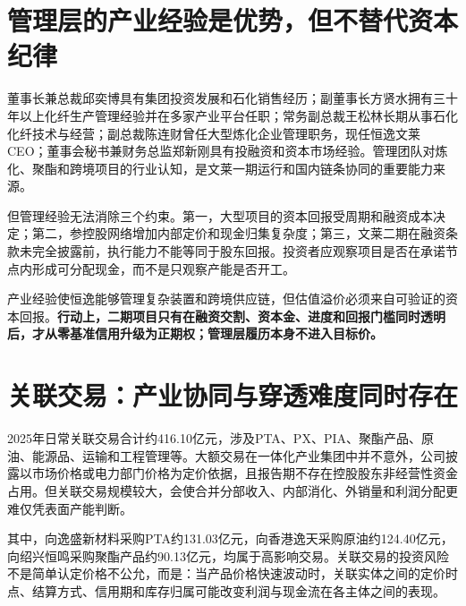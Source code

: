 \section{管理层的产业经验是优势，但不替代资本纪律}

董事长兼总裁邱奕博具有集团投资发展和石化销售经历；副董事长方贤水拥有三十年以上化纤生产管理经验并在多家产业平台任职；常务副总裁王松林长期从事石化化纤技术与经营；副总裁陈连财曾任大型炼化企业管理职务，现任恒逸文莱CEO；董事会秘书兼财务总监郑新刚具有投融资和资本市场经验。管理团队对炼化、聚酯和跨境项目的行业认知，是文莱一期运行和国内链条协同的重要能力来源。

但管理经验无法消除三个约束。第一，大型项目的资本回报受周期和融资成本决定；第二，参控股网络增加内部定价和现金归集复杂度；第三，文莱二期在融资条款未完全披露前，执行能力不能等同于股东回报。投资者应观察项目是否在承诺节点内形成可分配现金，而不是只观察产能是否开工。

\begin{keyinsight}
产业经验使恒逸能够管理复杂装置和跨境供应链，但估值溢价必须来自可验证的资本回报。\textbf{行动上，二期项目只有在融资交割、资本金、进度和回报门槛同时透明后，才从零基准信用升级为正期权；管理层履历本身不进入目标价。}
\end{keyinsight}

\section{关联交易：产业协同与穿透难度同时存在}

2025年日常关联交易合计约416.10亿元，涉及PTA、PX、PIA、聚酯产品、原油、能源品、运输和工程管理等。大额交易在一体化产业集团中并不意外，公司披露以市场价格或电力部门价格为定价依据，且报告期不存在控股股东非经营性资金占用。但关联交易规模较大，会使合并分部收入、内部消化、外销量和利润分配更难仅凭表面产能判断。

其中，向逸盛新材料采购PTA约131.03亿元，向香港逸天采购原油约124.40亿元，向绍兴恒鸣采购聚酯产品约90.13亿元，均属于高影响交易。关联交易的投资风险不是简单认定价格不公允，而是：当产品价格快速波动时，关联实体之间的定价时点、结算方式、信用期和库存归属可能改变利润与现金流在各主体之间的表现。

